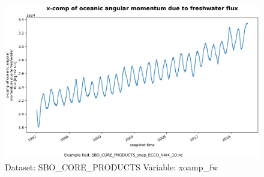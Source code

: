 \begin{figure}[H]
\centering
\includegraphics[width=\textwidth]{../images/plots/oneD_plots/SBO_Core_Products/xoamp_fw.png}
\caption{Dataset: SBO\_CORE\_PRODUCTS Variable: xoamp\_fw}
\label{tab:table-SBO_CORE_PRODUCTS_xoamp_fw-Plot}
\end{figure}
\pagebreak
